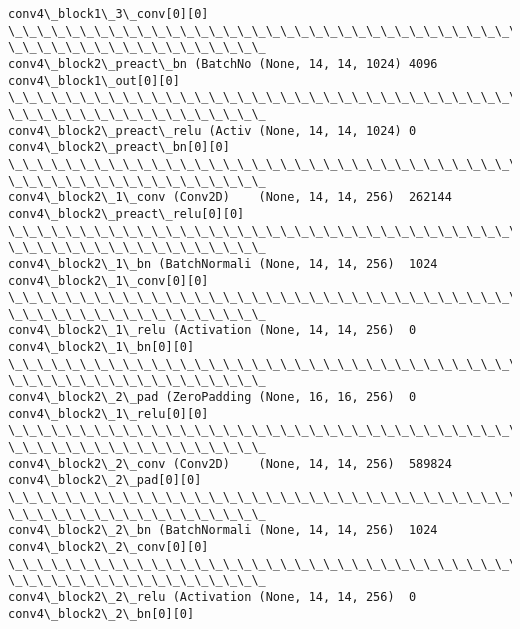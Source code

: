 \documentclass[11pt]{article}
\begin{document}
\begin{Verbatim}[commandchars=\\\{\}]
conv4\_block1\_3\_conv[0][0]
\_\_\_\_\_\_\_\_\_\_\_\_\_\_\_\_\_\_\_\_\_\_\_\_\_\_\_\_\_\_\_\_\_\_\_\_\_\_\_\_\_\_\_\_\_\_\_\_\_\_\_\_\_\_\_\_\_\_\_\_\_\_\_\_\_\_\_\_\_\_\_\_\_\_\_\_\_\_\_\_
\_\_\_\_\_\_\_\_\_\_\_\_\_\_\_\_\_\_
conv4\_block2\_preact\_bn (BatchNo (None, 14, 14, 1024) 4096
conv4\_block1\_out[0][0]
\_\_\_\_\_\_\_\_\_\_\_\_\_\_\_\_\_\_\_\_\_\_\_\_\_\_\_\_\_\_\_\_\_\_\_\_\_\_\_\_\_\_\_\_\_\_\_\_\_\_\_\_\_\_\_\_\_\_\_\_\_\_\_\_\_\_\_\_\_\_\_\_\_\_\_\_\_\_\_\_
\_\_\_\_\_\_\_\_\_\_\_\_\_\_\_\_\_\_
conv4\_block2\_preact\_relu (Activ (None, 14, 14, 1024) 0
conv4\_block2\_preact\_bn[0][0]
\_\_\_\_\_\_\_\_\_\_\_\_\_\_\_\_\_\_\_\_\_\_\_\_\_\_\_\_\_\_\_\_\_\_\_\_\_\_\_\_\_\_\_\_\_\_\_\_\_\_\_\_\_\_\_\_\_\_\_\_\_\_\_\_\_\_\_\_\_\_\_\_\_\_\_\_\_\_\_\_
\_\_\_\_\_\_\_\_\_\_\_\_\_\_\_\_\_\_
conv4\_block2\_1\_conv (Conv2D)    (None, 14, 14, 256)  262144
conv4\_block2\_preact\_relu[0][0]
\_\_\_\_\_\_\_\_\_\_\_\_\_\_\_\_\_\_\_\_\_\_\_\_\_\_\_\_\_\_\_\_\_\_\_\_\_\_\_\_\_\_\_\_\_\_\_\_\_\_\_\_\_\_\_\_\_\_\_\_\_\_\_\_\_\_\_\_\_\_\_\_\_\_\_\_\_\_\_\_
\_\_\_\_\_\_\_\_\_\_\_\_\_\_\_\_\_\_
conv4\_block2\_1\_bn (BatchNormali (None, 14, 14, 256)  1024
conv4\_block2\_1\_conv[0][0]
\_\_\_\_\_\_\_\_\_\_\_\_\_\_\_\_\_\_\_\_\_\_\_\_\_\_\_\_\_\_\_\_\_\_\_\_\_\_\_\_\_\_\_\_\_\_\_\_\_\_\_\_\_\_\_\_\_\_\_\_\_\_\_\_\_\_\_\_\_\_\_\_\_\_\_\_\_\_\_\_
\_\_\_\_\_\_\_\_\_\_\_\_\_\_\_\_\_\_
conv4\_block2\_1\_relu (Activation (None, 14, 14, 256)  0
conv4\_block2\_1\_bn[0][0]
\_\_\_\_\_\_\_\_\_\_\_\_\_\_\_\_\_\_\_\_\_\_\_\_\_\_\_\_\_\_\_\_\_\_\_\_\_\_\_\_\_\_\_\_\_\_\_\_\_\_\_\_\_\_\_\_\_\_\_\_\_\_\_\_\_\_\_\_\_\_\_\_\_\_\_\_\_\_\_\_
\_\_\_\_\_\_\_\_\_\_\_\_\_\_\_\_\_\_
conv4\_block2\_2\_pad (ZeroPadding (None, 16, 16, 256)  0
conv4\_block2\_1\_relu[0][0]
\_\_\_\_\_\_\_\_\_\_\_\_\_\_\_\_\_\_\_\_\_\_\_\_\_\_\_\_\_\_\_\_\_\_\_\_\_\_\_\_\_\_\_\_\_\_\_\_\_\_\_\_\_\_\_\_\_\_\_\_\_\_\_\_\_\_\_\_\_\_\_\_\_\_\_\_\_\_\_\_
\_\_\_\_\_\_\_\_\_\_\_\_\_\_\_\_\_\_
conv4\_block2\_2\_conv (Conv2D)    (None, 14, 14, 256)  589824
conv4\_block2\_2\_pad[0][0]
\_\_\_\_\_\_\_\_\_\_\_\_\_\_\_\_\_\_\_\_\_\_\_\_\_\_\_\_\_\_\_\_\_\_\_\_\_\_\_\_\_\_\_\_\_\_\_\_\_\_\_\_\_\_\_\_\_\_\_\_\_\_\_\_\_\_\_\_\_\_\_\_\_\_\_\_\_\_\_\_
\_\_\_\_\_\_\_\_\_\_\_\_\_\_\_\_\_\_
conv4\_block2\_2\_bn (BatchNormali (None, 14, 14, 256)  1024
conv4\_block2\_2\_conv[0][0]
\_\_\_\_\_\_\_\_\_\_\_\_\_\_\_\_\_\_\_\_\_\_\_\_\_\_\_\_\_\_\_\_\_\_\_\_\_\_\_\_\_\_\_\_\_\_\_\_\_\_\_\_\_\_\_\_\_\_\_\_\_\_\_\_\_\_\_\_\_\_\_\_\_\_\_\_\_\_\_\_
\_\_\_\_\_\_\_\_\_\_\_\_\_\_\_\_\_\_
conv4\_block2\_2\_relu (Activation (None, 14, 14, 256)  0
conv4\_block2\_2\_bn[0][0]

\end{Verbatim}
\end{document}

